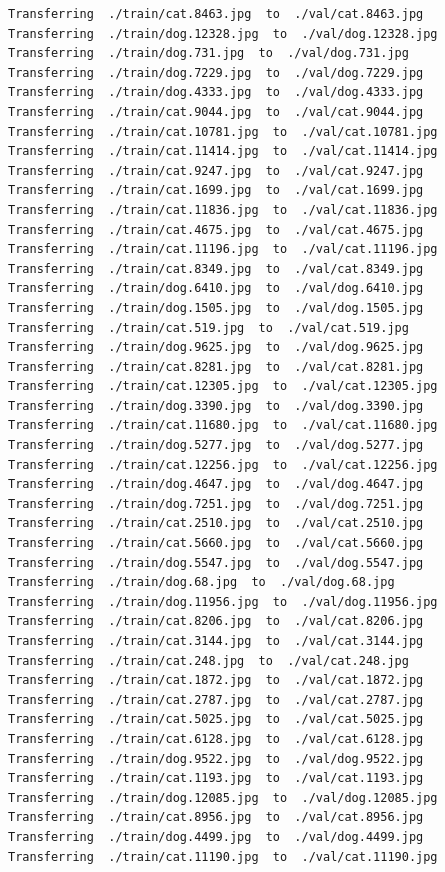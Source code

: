 \documentclass[]{book}
\theoremstyle{definition}
\theoremstyle{definition}
\theoremstyle{definition}
\theoremstyle{remark}
\begin{document}
\begin{verbatim}
Transferring  ./train/cat.8463.jpg  to  ./val/cat.8463.jpg
Transferring  ./train/dog.12328.jpg  to  ./val/dog.12328.jpg
Transferring  ./train/dog.731.jpg  to  ./val/dog.731.jpg
Transferring  ./train/dog.7229.jpg  to  ./val/dog.7229.jpg
Transferring  ./train/dog.4333.jpg  to  ./val/dog.4333.jpg
Transferring  ./train/cat.9044.jpg  to  ./val/cat.9044.jpg
Transferring  ./train/cat.10781.jpg  to  ./val/cat.10781.jpg
Transferring  ./train/cat.11414.jpg  to  ./val/cat.11414.jpg
Transferring  ./train/cat.9247.jpg  to  ./val/cat.9247.jpg
Transferring  ./train/cat.1699.jpg  to  ./val/cat.1699.jpg
Transferring  ./train/cat.11836.jpg  to  ./val/cat.11836.jpg
Transferring  ./train/cat.4675.jpg  to  ./val/cat.4675.jpg
Transferring  ./train/cat.11196.jpg  to  ./val/cat.11196.jpg
Transferring  ./train/cat.8349.jpg  to  ./val/cat.8349.jpg
Transferring  ./train/dog.6410.jpg  to  ./val/dog.6410.jpg
Transferring  ./train/dog.1505.jpg  to  ./val/dog.1505.jpg
Transferring  ./train/cat.519.jpg  to  ./val/cat.519.jpg
Transferring  ./train/dog.9625.jpg  to  ./val/dog.9625.jpg
Transferring  ./train/cat.8281.jpg  to  ./val/cat.8281.jpg
Transferring  ./train/cat.12305.jpg  to  ./val/cat.12305.jpg
Transferring  ./train/dog.3390.jpg  to  ./val/dog.3390.jpg
Transferring  ./train/cat.11680.jpg  to  ./val/cat.11680.jpg
Transferring  ./train/dog.5277.jpg  to  ./val/dog.5277.jpg
Transferring  ./train/cat.12256.jpg  to  ./val/cat.12256.jpg
Transferring  ./train/dog.4647.jpg  to  ./val/dog.4647.jpg
Transferring  ./train/dog.7251.jpg  to  ./val/dog.7251.jpg
Transferring  ./train/cat.2510.jpg  to  ./val/cat.2510.jpg
Transferring  ./train/cat.5660.jpg  to  ./val/cat.5660.jpg
Transferring  ./train/dog.5547.jpg  to  ./val/dog.5547.jpg
Transferring  ./train/dog.68.jpg  to  ./val/dog.68.jpg
Transferring  ./train/dog.11956.jpg  to  ./val/dog.11956.jpg
Transferring  ./train/cat.8206.jpg  to  ./val/cat.8206.jpg
Transferring  ./train/cat.3144.jpg  to  ./val/cat.3144.jpg
Transferring  ./train/cat.248.jpg  to  ./val/cat.248.jpg
Transferring  ./train/cat.1872.jpg  to  ./val/cat.1872.jpg
Transferring  ./train/cat.2787.jpg  to  ./val/cat.2787.jpg
Transferring  ./train/cat.5025.jpg  to  ./val/cat.5025.jpg
Transferring  ./train/cat.6128.jpg  to  ./val/cat.6128.jpg
Transferring  ./train/dog.9522.jpg  to  ./val/dog.9522.jpg
Transferring  ./train/cat.1193.jpg  to  ./val/cat.1193.jpg
Transferring  ./train/dog.12085.jpg  to  ./val/dog.12085.jpg
Transferring  ./train/cat.8956.jpg  to  ./val/cat.8956.jpg
Transferring  ./train/dog.4499.jpg  to  ./val/dog.4499.jpg
Transferring  ./train/cat.11190.jpg  to  ./val/cat.11190.jpg

\end{verbatim}
\end{document}
